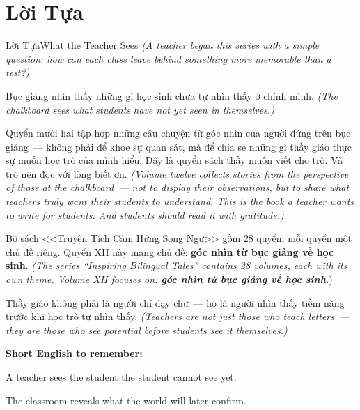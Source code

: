 \chapter*{Lời Tựa}

\begin{truyen}{Lời Tựa}{What the Teacher Sees}
\textit{(A teacher began this series with a simple question: how can each class leave behind something more memorable than a test?)}

Bục giảng nhìn thấy những gì học sinh chưa tự nhìn thấy ở chính mình.
\textit{(The chalkboard sees what students have not yet seen in themselves.)}

Quyển mười hai tập hợp những câu chuyện từ góc nhìn của người đứng trên bục giảng~--- không phải để khoe sự quan sát, mà để chia sẻ những gì thầy giáo thực sự muốn học trò của mình hiểu. Đây là quyển sách thầy muốn viết cho trò. Và trò nên đọc với lòng biết ơn.
\textit{(Volume twelve collects stories from the perspective of those at the chalkboard~--- not to display their observations, but to share what teachers truly want their students to understand. This is the book a teacher wants to write for students. And students should read it with gratitude.)}

Bộ sách <<Truyện Tích Cảm Hứng Song Ngữ>> gồm 28 quyển, mỗi quyển một chủ đề riêng. Quyển XII này mang chủ đề: \textbf{góc nhìn từ bục giảng về học sinh}.
\textit{(The series ``Inspiring Bilingual Tales'' contains 28 volumes, each with its own theme. Volume XII focuses on: \textbf{góc nhìn từ bục giảng về học sinh}.})
\end{truyen}

\begin{baihoc}
Thầy giáo không phải là người chỉ dạy chữ~--- họ là người nhìn thấy tiềm năng trước khi học trò tự nhìn thấy.
\textit{(Teachers are not just those who teach letters~--- they are those who see potential before students see it themselves.)}
\end{baihoc}

\begin{ghinhoanh}
\textbf{Short English to remember:}

A teacher sees the student the student cannot see yet.

The classroom reveals what the world will later confirm.
\end{ghinhoanh}

